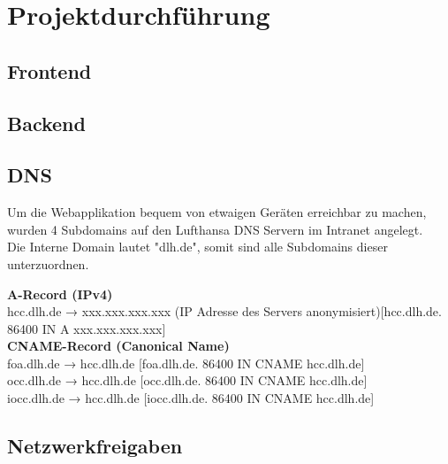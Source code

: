 \section{Projektdurchführung}

	\subsection{Frontend}
	\subsection{Backend}
	\subsubsection{}
	\subsection{DNS}
	Um die Webapplikation bequem von etwaigen Geräten erreichbar zu machen, wurden 4 Subdomains auf den Lufthansa DNS Servern im Intranet angelegt.\\
	Die Interne Domain lautet "dlh.de", somit sind alle Subdomains dieser unterzuordnen. 

	\vspace{8pt}

	\textbf{A-Record (IPv4)}\\
	hcc.dlh.de → xxx.xxx.xxx.xxx (IP Adresse des Servers anonymisiert)[hcc.dlh.de. 86400 IN A xxx.xxx.xxx.xxx]\\

	\textbf{CNAME-Record (Canonical Name)}\\
	foa.dlh.de → hcc.dlh.de [foa.dlh.de. 86400 IN CNAME hcc.dlh.de]\\
	occ.dlh.de → hcc.dlh.de [occ.dlh.de. 86400 IN CNAME hcc.dlh.de]\\
	iocc.dlh.de → hcc.dlh.de [iocc.dlh.de. 86400 IN CNAME hcc.dlh.de]\\

	\subsection{Netzwerkfreigaben}